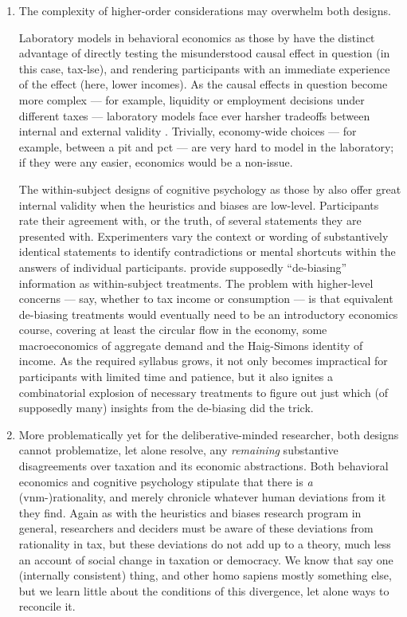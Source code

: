 \begin{enumerate}
	\item The complexity of higher-order considerations may overwhelm both designs.

	Laboratory models in behavioral economics as those by \citeauthor{SausgruberTyran2011} have the distinct advantage of directly testing the misunderstood causal effect in question (in this case, \gls{tax-lse}), and rendering participants with an immediate experience of the effect (here, lower incomes).
	As the causal effects in question become more complex --- for example, liquidity or employment decisions under different taxes --- laboratory models face ever harsher tradeoffs between internal and external validity \citep[for a review and dissenting opinion, see][]{Jimenez-Buedo2010}.
	Trivially, economy-wide choices --- for example, between a \gls{pit} and \gls{pct} --- are very hard to model in the laboratory;
	if they were any easier, economics would be a non-issue.

	The within-subject designs of cognitive psychology as those by \citeauthor{McCafferyBaron2004} also offer great internal validity when the heuristics and biases are low-level.
	Participants rate their agreement with, or the truth, of several statements they are presented with.
	Experimenters vary the context or wording of substantively identical statements to identify contradictions or mental shortcuts within the answers of individual participants.
	\citeauthor{McCafferyBaron2004} provide supposedly ``de-biasing'' information as within-subject treatments.
	The problem with higher-level concerns --- say, whether to tax income or consumption --- is that equivalent de-biasing treatments would eventually need to be an introductory economics course, covering at least the circular flow in the economy, some macroeconomics of aggregate demand and the Haig-Simons identity of income.
	As the required syllabus grows, it not only becomes impractical for participants with limited time and patience, but it also ignites a combinatorial explosion of necessary treatments to figure out just which (of supposedly many) insights from the de-biasing did the trick.

	\item More problematically yet for the deliberative-minded researcher, both designs cannot problematize, let alone resolve, any \emph{remaining} substantive disagreements over taxation and its economic abstractions.
	Both behavioral economics and cognitive psychology stipulate that there is \emph{a} (\gls{vnm}-)rationality, and merely chronicle whatever human deviations from it they find.
	Again as with the heuristics and biases research program in general, researchers and deciders must be aware of these deviations from rationality in tax, but these deviations do not add up to a theory, much less an account of social change in taxation or democracy.
	We know that \citeauthor{VonNeumannMorgenstern1944} say one (internally consistent) thing, and other homo sapiens mostly something else, but we learn little about the conditions of this divergence, let alone ways to reconcile it.


\end{enumerate}
